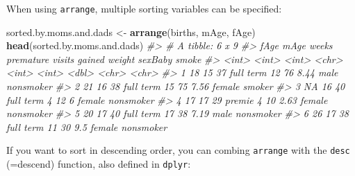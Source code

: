 \documentclass[]{book}
\newenvironment{Shaded}{\begin{snugshade}}{\end{snugshade}}
\newcommand{\CommentTok}[1]{\textcolor[rgb]{0.56,0.35,0.01}{\textit{#1}}}
\newcommand{\KeywordTok}[1]{\textcolor[rgb]{0.13,0.29,0.53}{\textbf{#1}}}
\newcommand{\NormalTok}[1]{#1}
\newcommand{\OperatorTok}[1]{\textcolor[rgb]{0.81,0.36,0.00}{\textbf{#1}}}
\newcommand{\StringTok}[1]{\textcolor[rgb]{0.31,0.60,0.02}{#1}}
\theoremstyle{definition}
\theoremstyle{definition}
\theoremstyle{definition}
\theoremstyle{remark}
\begin{document}
\begin{Shaded}
\end{Shaded}

When using \texttt{arrange}, multiple sorting variables can be
specified:

\begin{Shaded}
\begin{Highlighting}[]
\NormalTok{sorted.by.moms.and.dads <-}\StringTok{ }\KeywordTok{arrange}\NormalTok{(births, mAge, fAge)}
\KeywordTok{head}\NormalTok{(sorted.by.moms.and.dads)}
\CommentTok{#> # A tibble: 6 x 9}
\CommentTok{#>    fAge  mAge weeks premature visits gained weight sexBaby smoke    }
\CommentTok{#>   <int> <int> <int> <chr>      <int>  <int>  <dbl> <chr>   <chr>    }
\CommentTok{#> 1    18    15    37 full term     12     76   8.44 male    nonsmoker}
\CommentTok{#> 2    21    16    38 full term     15     75   7.56 female  smoker   }
\CommentTok{#> 3    NA    16    40 full term      4     12   6    female  nonsmoker}
\CommentTok{#> 4    17    17    29 premie         4     10   2.63 female  nonsmoker}
\CommentTok{#> 5    20    17    40 full term     17     38   7.19 male    nonsmoker}
\CommentTok{#> 6    26    17    38 full term     11     30   9.5  female  nonsmoker}
\end{Highlighting}
\end{Shaded}

If you want to sort in descending order, you can combing
\texttt{arrange} with the \texttt{desc} (=descend) function, also
defined in \texttt{dplyr}:
\end{document}
